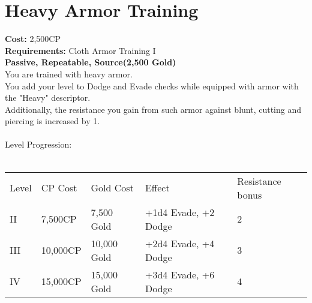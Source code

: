 \section{Heavy Armor Training}\label{perk:heavyArmorTraining}
\textbf{Cost:} 2,500CP\\
\textbf{Requirements:} Cloth Armor Training I\\
\textbf{Passive, Repeatable, Source(2,500 Gold)}\\
You are trained with heavy armor.\\
You add your level to Dodge and Evade checks while equipped with armor with the "Heavy" descriptor.\\
Additionally, the resistance you gain from such armor against blunt, cutting and piercing is increased by 1.\\
\\

Level Progression:\\
\\
\begin{tabular}{l | l | l | l | l}
    Level & CP Cost & Gold Cost & Effect & Resistance bonus \\
    II
    & 7,500CP
    & 7,500 Gold
    & +1d4 Evade, +2 Dodge
    & 2
    \\
    III
    & 10,000CP
    & 10,000 Gold
    & +2d4 Evade, +4 Dodge
    & 3
    \\
    IV
    & 15,000CP
    & 15,000 Gold
    & +3d4 Evade, +6 Dodge
    & 4
    \\
\end{tabular}